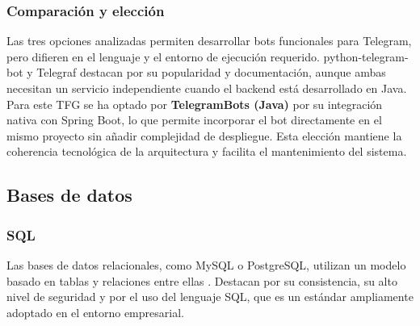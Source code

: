 \subsubsection{Comparación y elección}
Las tres opciones analizadas permiten desarrollar bots funcionales para Telegram, pero difieren en el lenguaje y el entorno de ejecución requerido. python-telegram-bot y Telegraf destacan por su popularidad y documentación, aunque ambas necesitan un servicio independiente cuando el backend está desarrollado en Java. Para este TFG se ha optado por \textbf{TelegramBots (Java)} por su integración nativa con Spring Boot, lo que permite incorporar el bot directamente en el mismo proyecto sin añadir complejidad de despliegue. Esta elección mantiene la coherencia tecnológica de la arquitectura y facilita el mantenimiento del sistema.

\begin{table}[H]
\centering
{}
\caption{Comparativa de librerías para bots de Telegram}
\end{table}


\subsection{Bases de datos}

\subsubsection{SQL}
Las bases de datos relacionales, como MySQL o PostgreSQL, utilizan un modelo basado en tablas y relaciones entre ellas \cite{mysqlDocs}. Destacan por su consistencia, su alto nivel de seguridad y por el uso del lenguaje SQL, que es un estándar ampliamente adoptado en el entorno empresarial.

